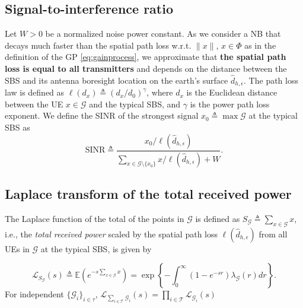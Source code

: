 \documentclass[conference]{IEEEtran}
\theoremstyle{definition}
\theoremstyle{plain}
\begin{document}
          \subsection{Signal-to-interference ratio}
          Let $W>0$ be a normalized noise power constant. As we consider a NB that decays much faster than the spatial path loss w.r.t. $\|x\|$, $x \in \Phi$ as in the definition of the GP \eqref{eq:gainprocess}, we approximate that \textbf{the spatial path loss is equal to all transmitters} and depends on the distance between the SBS and its antenna boresight location on the earth's surface $\hat{d}_{h,\epsilon}$. The path loss law is defined as $\ell({d_x}) \triangleq ({d_x}/d_0)^{\gamma}$, where $d_x$ is the Euclidean distance between the UE $x \in \mathcal{G}$ and the typical SBS, and $\gamma$ is the power path loss exponent. We define the SINR of the strongest signal $x_0 \triangleq \max  \mathcal{G}$ at the typical SBS as
          \begin{equation}
            \text{SINR} \triangleq \frac{x_0/\ell(\hat{d}_{h,\epsilon})}{\sum\limits_{x \in \mathcal{G} \setminus \{x_0\}}x/\ell(\hat{d}_{h,\epsilon})+ W}.
          \end{equation}

          \subsection{Laplace transform of the total received power}

          The Laplace function of the total of the points in $\mathcal{G}$ is defined as $S_{\mathcal{G}} \triangleq \sum_{x \in \mathcal{G}}x$, i.e., the \textit{total received power} scaled by the spatial path loss $\ell(\hat{d}_{h,\epsilon})$ from all UEs in $\mathcal{G}$ at the typical SBS, is given by

          \begin{equation}
            \label{eq:lapdef}
            \mathcal{L}_{S_{\mathcal{G}}}(s)\triangleq \mathbb{E}\left(e^{-s\sum\limits_{x \in \mathcal{G}}x}\right)= \exp\left\{-\int_0^{\infty}(1-e^{-sr}) \lambda_{\mathcal{G}}(r) dr \right\}.
          \end{equation}
          For independent $\{\mathcal{G}_i\}_{i \in \mathcal{\tau}}$, $\mathcal{L}_{\sum_{i \in \mathcal{T}} \mathcal{G}_i}(s) = \prod_{i \in \mathcal{T}} \mathcal{L}_{\mathcal{G}_i}(s)$

          
\end{document}
